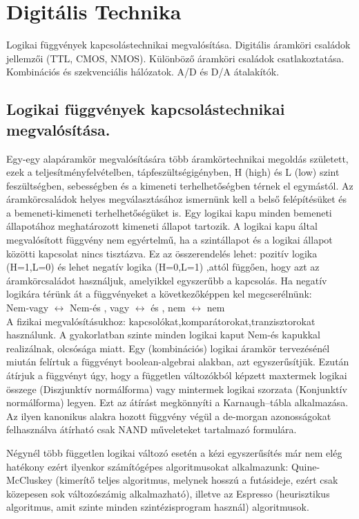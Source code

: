 \section{Digitális Technika}
{\footnotesize Logikai függvények kapcsolástechnikai megvalósítása. Digitális áramköri családok jellemzői (TTL, CMOS, NMOS). Különböző áramköri családok csatlakoztatása. Kombinációs és szekvenciális hálózatok. A/D és D/A átalakítók.}
\subsection{Logikai függvények kapcsolástechnikai megvalósítása.}
Egy-egy alapáramkör megvalósítására több áramkörtechnikai megoldás született, ezek a teljesítményfelvételben, tápfeszültségigényben, H (high) és L (low) szint feszültségben, sebességben és a kimeneti terhelhetőségben térnek el egymástól. Az áramkörcsaládok helyes megválasztásához ismernünk kell a belső felépítésüket és a bemeneti-kimeneti terhelhetőségüket is. Egy logikai kapu minden bemeneti állapotához meghatározott kimeneti állapot tartozik. A logikai kapu által megvalósított függvény nem egyértelmű, ha a szintállapot és a logikai állapot közötti kapcsolat nincs tisztázva. Ez az összerendelés lehet: pozitív logika (H=1,L=0) és lehet negatív logika (H=0,L=1) ,attól függően, hogy azt az áramkörcsaládot használjuk, amelyikkel egyszerűbb a kapcsolás. Ha negatív logikára térünk át a függvényeket a következőképpen kel megcserélnünk:\\
Nem-vagy $\leftrightarrow$ Nem-és , vagy $\leftrightarrow$ és , nem $\leftrightarrow$ nem\\ 
A fizikai megvalósításukhoz: kapcsolókat,komparátorokat,tranzisztorokat használunk. A gyakorlatban szinte minden logikai kaput Nem-és kapukkal realizálnak, olcsósága miatt.
Egy (kombinációs) logikai áramkör tervezésénél miután felírtuk a függvényt boolean-algebrai alakban, azt egyszerűsítjük. Ezután átírjuk a függvényt úgy, hogy a független változókból képzett maxtermek logikai összege (Diszjunktív normálforma) vagy mintermek logikai szorzata (Konjunktív normálforma) legyen. Ezt az átírást megkönnyíti a Karnaugh--tábla alkalmazása. Az ilyen kanonikus alakra hozott függvény végül a de-morgan azonosságokat felhasználva átírható csak NAND műveleteket tartalmazó formulára.

Négynél több független logikai változó esetén a kézi egyszerűsítés már nem elég hatékony ezért ilyenkor számítógépes algoritmusokat alkalmazunk: Quine-McCluskey (kimerítő teljes algoritmus, melynek hosszú a futásideje, ezért csak közepesen sok változószámig alkalmazható), illetve az Espresso (heurisztikus algoritmus, amit szinte minden szintézisprogram használ) algoritmusok.



